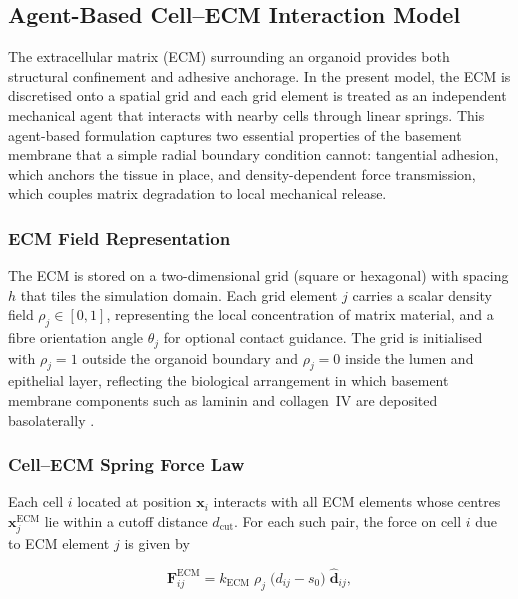 \subsection{Agent-Based Cell--ECM Interaction Model}
\label{sec:ecm_confinement}

The extracellular matrix (ECM) surrounding an organoid provides both structural confinement and adhesive anchorage.
In the present model, the ECM is discretised onto a spatial grid and each grid element is treated as an independent mechanical agent that interacts with nearby cells through linear springs.
This agent-based formulation captures two essential properties of the basement membrane that a simple radial boundary condition cannot: tangential adhesion, which anchors the tissue in place, and density-dependent force transmission, which couples matrix degradation to local mechanical release.

\subsubsection{ECM Field Representation}

The ECM is stored on a two-dimensional grid (square or hexagonal) with spacing $h$ that tiles the simulation domain.
Each grid element $j$ carries a scalar density field $\rho_j \in [0,1]$, representing the local concentration of matrix material, and a fibre orientation angle $\theta_j$ for optional contact guidance.
The grid is initialised with $\rho_j = 1$ outside the organoid boundary and $\rho_j = 0$ inside the lumen and epithelial layer, reflecting the biological arrangement in which basement membrane components such as laminin and collagen~IV are deposited basolaterally \cite{Yurchenco2011}.

\subsubsection{Cell--ECM Spring Force Law}

Each cell $i$ located at position $\mathbf{x}_i$ interacts with all ECM elements whose centres $\mathbf{x}_j^{\text{ECM}}$ lie within a cutoff distance $d_{\text{cut}}$.
For each such pair, the force on cell $i$ due to ECM element $j$ is given by

\begin{equation}
    \mathbf{F}_{ij}^{\text{ECM}} = k_{\text{ECM}}\;\rho_j\;\bigl(d_{ij} - s_0\bigr)\;\hat{\mathbf{d}}_{ij},
    \label{eq:ecm_spring}
\end{equation}

